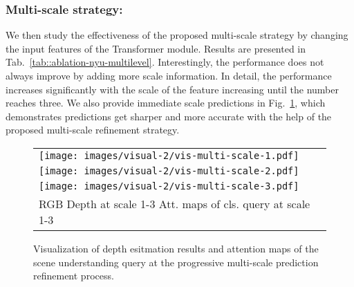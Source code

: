 \documentclass[runningheads]{llncs}
\begin{document}
\subsubsection{Multi-scale strategy:} We then study the effectiveness of the proposed multi-scale strategy by changing the input features  of the Transformer module. Results are presented in Tab.~\ref{tab::ablation-nyu-multilevel}. Interestingly, the performance does not always improve by adding more scale information. In detail, the performance increases significantly with the scale of the feature increasing until the number reaches three. We also provide immediate scale predictions in Fig.~\ref{fig::visual-2}, which demonstrates predictions get sharper and more accurate with the help of the proposed multi-scale refinement strategy.


\begin{figure}[t]
    \centering
    \footnotesize
    \begin{tabular}{l}
        \texttt{[image: images/visual-2/vis-multi-scale-1.pdf]} \vspace{-0.2cm}\\
        \texttt{[image: images/visual-2/vis-multi-scale-2.pdf]} \vspace{-0.2cm}\\
        \texttt{[image: images/visual-2/vis-multi-scale-3.pdf]} \\
        \hspace{0.035\linewidth}RGB
        \hspace{0.13\linewidth}Depth at scale 1-3
        \hspace{0.09\linewidth}Att. maps of cls. query at scale 1-3\\
    \end{tabular}
    \caption{Visualization of depth esitmation results and attention maps of the scene understanding query at the progressive multi-scale prediction refinement process.}
    \label{fig::visual-2}
\end{figure}
\end{document}
